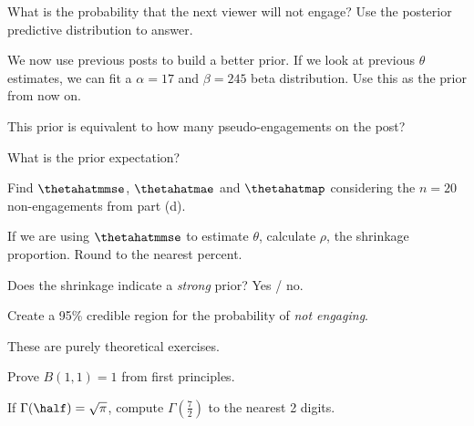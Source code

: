 \documentclass[12pt]{article}
\begin{document}
 What is the probability that the next viewer will not engage? Use the posterior predictive distribution to answer.

We now use previous posts to build a better prior. If we look at previous $\theta$ estimates, we can fit a $\alpha=17$ and $\beta=245$ beta distribution. Use this as the prior from now on.

 This prior is equivalent to how many pseudo-engagements on the post? 

 What is the prior expectation? 

 Find $\thetahatmmse$, $\thetahatmae$ and $\thetahatmap$ considering the $n=20$ non-engagements from part (d). 

 If we are using $\thetahatmmse$ to estimate $\theta$, calculate $\rho$, the shrinkage proportion. Round to the nearest percent. 


 Does the shrinkage indicate a \emph{strong} prior? Yes / no. 

 Create a 95\% credible region for the probability of \emph{not engaging}. 

\eenum

\problem These are purely theoretical exercises.

\benum


 Prove $B(1,1) = 1$ from first principles. 

 If $\Gamma(\half) = \sqrt{\pi}$, compute $\Gamma(\frac{7}{2})$ to the nearest 2 digits. 
\eenum
\end{document}
